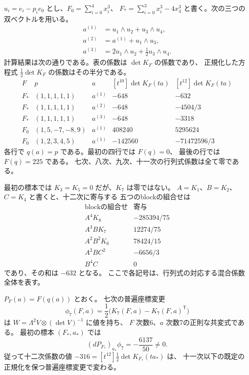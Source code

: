 $u_i=e_i-p_i e_0$ とし、$F_0=\sum_{i=0}^4x_i^3$、
$F_*=\sum_{i=0}^3x_i^3-4x_4^3$ と書く。次の三つの双ベクトルを用いる。
\[
 \begin{aligned}
 a^{(1)}&=u_1\wedge u_2+u_3\wedge u_4,\\
 a^{(2)}&=a^{(1)}+u_1\wedge u_3,\\
 a^{(3)}&=2u_1\wedge u_2+\tfrac12u_3\wedge u_4.
 \end{aligned}
\]
計算結果は次の通りである。表の係数は $\det K_F$ の係数であり、
正規化した方程式 $\frac12\det K_F$ の係数はその半分である。
\[
\begin{array}{c|c|c|r|r}
 F &p&a&[t^{10}]\det K_F(ta)&[t^{12}]\det K_F(ta)\\ \hline
 F_*&(1,1,1,1,1)&a^{(1)}&-648&-632\\
 F_*&(1,1,1,1,1)&a^{(2)}&-648&-4504/3\\
 F_*&(1,1,1,1,1)&a^{(3)}&-648&-3318\\
 F_0&(1,5,-7,-8,9)&a^{(1)}&408240&5295624\\
 F_0&(1,2,3,4,5)&a^{(1)}&-142560&-71472596/3
\end{array}
\]
各行で $q(a)=p$ である。最初の四行では $F(q)=0$、
最後の行では $F(q)=225$ である。
七次、八次、九次、十一次の行列式係数は全て零である。

最初の標本では $K_3=K_5=0$ だが、$K_7$ は零ではない。
$A=K_1$、$B=K_2$、$C=K_4$ と書くと、十二次に寄与する
五つのblockの組合せは
\[
\begin{array}{c|r}
 \text{blockの組合せ}&\text{寄与}\\ \hline
 A^4K_8&-285394/75\\
 A^3BK_7&12274/75\\
 A^2B^2K_6&78424/15\\
 A^2BC^2&-6656/3\\
 B^4C&0
\end{array}
\]
であり、その和は $-632$ となる。
ここで各記号は、行列式の対応する混合係数全体を表す。

\begin{proposition}[十二次の標本値は座標不変ではない]
\label{prop:v9-twelfth-gauge}
$P_F(a)=F(q(a))$ とおく。
七次の普遍座標変更
\[
 \phi_7(F,a)=\frac12\bigl(K_7(F,a)-K_7(F,a)^{\mathsf T}\bigr)
\]
は $W=\Lambda^2V\otimes(\det V)^{-1}$ に値を持ち、
$F$ 次数6、$a$ 次数7の正則な共変式である。
最初の標本 $(F_*,a_*)$ では
\[
                    (dP_{F_*})_{a_*}\phi_7=-\frac{6137}{50}\ne0.
\]
従って十二次係数の値 $-316=[t^{12}]\frac12\det K_{F_*}(ta_*)$ は、
十一次以下の既定の正規化を保つ普遍座標変更で変わる。
\end{proposition}

